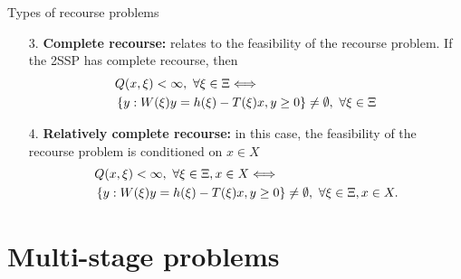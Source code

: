 \begin{frame}{Types of recourse problems}
	
	\begin{enumerate}[<+->]
		\item[3.] {\bf Complete recourse:} relates to the \alert{feasibility} of the recourse problem. If the 2SSP has complete recourse, then
		\begin{align*}
			& Q(x,\xi) < \infty, \ \forall \xi \in \Xi \Longleftrightarrow \\
			& \left\{ y : W(\xi)y = h(\xi) - T(\xi)x, y \ge 0 \right \} \neq \emptyset, \ \forall \xi \in \Xi 
		\end{align*}
	    \item[4.] {\bf Relatively complete recourse:} in this case, the feasibility of the recourse problem is \alert{conditioned} on $x \in X$
		\begin{align*}
			& Q(x,\xi) < \infty, \ \forall \xi \in \Xi, x \in X \Longleftrightarrow \\
			& \left\{ y : W(\xi)y = h(\xi) - T(\xi)x, y \ge 0 \right \} \neq \emptyset, \ \forall \xi \in \Xi, x \in X. 
		\end{align*}
	\end{enumerate}

	
\end{frame}


\section{Multi-stage problems}


